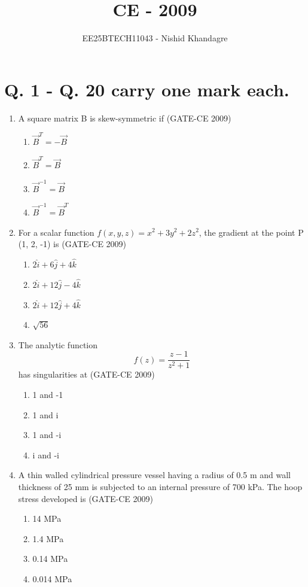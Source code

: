 \documentclass[journal,12pt,onecolumn]{article}
\theoremstyle{remark}
\begin{document}
\title{CE - 2009}
\author{EE25BTECH11043 - Nishid Khandagre}
\date{}
\maketitle

\renewcommand{\thefigure}{\theenumi}
\renewcommand{\thetable}{\theenumi}


\section*{Q. 1 - Q. 20 carry one mark each.}
\begin{enumerate}
    \item A square matrix B is skew-symmetric if (GATE-CE 2009)
    \begin{enumerate}
        \item $\vec{B}^T = -\vec{B}$ 
        \item $\vec{B}^T = \vec{B}$ 
        \item $\vec{B}^{-1} = \vec{B}$ 
        \item $\vec{B}^{-1} = \vec{B}^T$
    \end{enumerate}
    
    \item For a scalar function $f(x, y, z) = x^2 + 3y^2 + 2z^2$, the gradient at the point P (1, 2, -1) is (GATE-CE 2009)
    \begin{enumerate}
        \item $2\hat{i} + 6\hat{j}+ 4\hat{k}$
        \item $2\hat{i} + 12\hat{j} - 4\hat{k}$
        \item $2\hat{i} + 12\hat{j} + 4\hat{k}$
        \item $\sqrt{56}$
    \end{enumerate}
    
    \item The analytic function $$f(z) = \frac{z-1}{z^2+1}$$ has singularities at (GATE-CE 2009)
    \begin{enumerate}
        \item 1 and -1 
        \item 1 and i 
        \item 1 and -i 
        \item i and -i
    \end{enumerate}
    
    \item A thin walled cylindrical pressure vessel having a radius of 0.5 m and wall thickness of 25 mm is subjected to an internal pressure of 700 kPa. The hoop stress developed is (GATE-CE 2009)
    \begin{enumerate}
        \item 14 MPa 
        \item 1.4 MPa 
        \item 0.14 MPa 
        \item 0.014 MPa
    \end{enumerate}
    

\end{enumerate}
\end{document}
